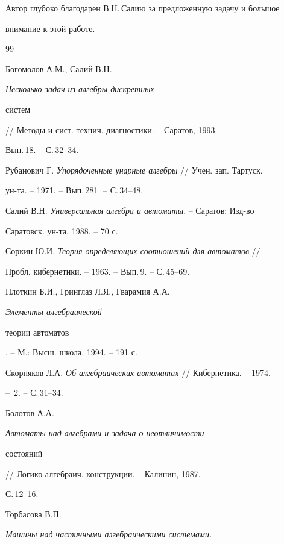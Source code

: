 




Автор глубоко благодарен В.Н.\,Салию за предложенную задачу и большое


внимание к этой работе.








\begin{thebibliography}{99}







Богомолов А.М., Салий В.Н. {\em Несколько задач из алгебры дискретных


систем} // Методы и сист. технич. диагностики. -- Саратов, 1993. -


Вып.\,18. -- С.\,32--34.




Рубанович Г. {\em Упорядоченные унарные алгебры} // Учен. зап. Тартуск.


ун-та. -- 1971. -- Вып.\,281. -- С.\,34--48.




Салий В.Н. {\em Универсальная алгебра и автоматы}. -- Саратов: Изд-во


Саратовск. ун-та, 1988. -- 70 с.




Соркин Ю.И. {\em Теория определяющих соотношений для автоматов} //


Пробл. кибернетики. -- 1963. -- Вып.\,9. -- С.\,45--69.




Плоткин Б.И., Гринглаз Л.Я., Гварамия А.А. {\em Элементы алгебраической


теории автоматов}. -- М.: Высш. школа, 1994. -- 191 с.




Скорняков Л.А. {\em Об алгебраических автоматах} // Кибернетика. -- 1974.


-- \No\,2. -- С.\,31--34.




Болотов А.А. {\em Автоматы над алгебрами и задача о неотличимости


состояний} // Логико-алгебраич. конструкции. -- Калинин, 1987. --


С.\,12--16.




Торбасова В.П. {\em Машины над частичными алгебраическими системами.


}
\end{thebibliography}
